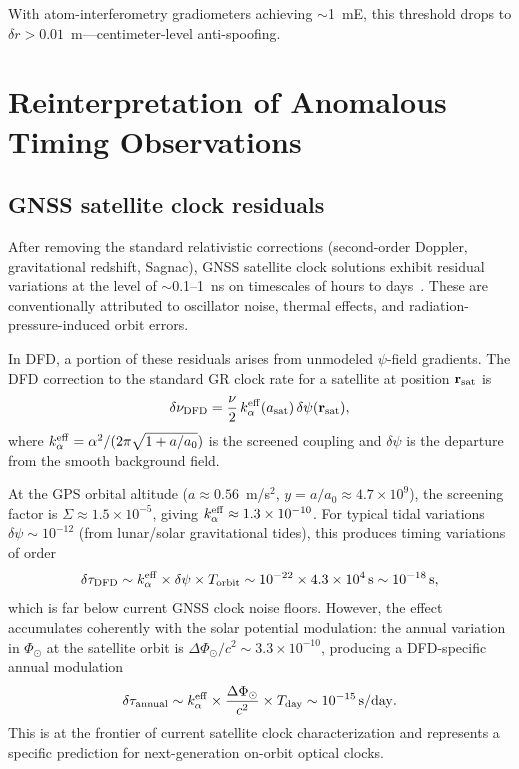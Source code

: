 \documentclass[aps,prd,twocolumn,superscriptaddress,nofootinbib]{revtex4-2}
\begin{document}
With atom-interferometry gradiometers achieving $\sim$1~mE, this
threshold drops to $\delta r > 0.01$~m---centimeter-level anti-spoofing.

\section{Reinterpretation of Anomalous Timing
Observations}\label{sec:anomalies}

\subsection{GNSS satellite clock residuals}\label{sec:gnss-residuals}

After removing the standard relativistic corrections (second-order
Doppler, gravitational redshift, Sagnac), GNSS satellite clock solutions
exhibit residual variations at the level of $\sim$0.1--1~ns on
timescales of hours to days~\cite{Senior2008,Galleani2008}. These
are conventionally attributed to oscillator noise, thermal effects, and
radiation-pressure-induced orbit errors.

In DFD, a portion of these residuals arises from unmodeled
$\psi$-field gradients. The DFD correction to the standard GR clock
rate for a satellite at position $\mathbf{r}_{\rm sat}$ is
\begin{equation}\label{eq:gnss-correction}
\delta\nu_{\rm DFD} = \frac{\nu}{2}\,k_\alpha^{\rm eff}(a_{\rm sat})
\,\delta\psi(\mathbf{r}_{\rm sat}),
\end{equation}
where $k_\alpha^{\rm eff} = \alpha^2/(2\pi\sqrt{1+a/a_0})$ is the
screened coupling and $\delta\psi$ is the departure from the
smooth background field.

At the GPS orbital altitude ($a \approx 0.56$~m/s$^2$,
$y = a/a_0 \approx 4.7\times10^9$), the screening factor is
$\Sigma \approx 1.5\times10^{-5}$, giving
$k_\alpha^{\rm eff} \approx 1.3\times10^{-10}$. For typical tidal
variations $\delta\psi \sim 10^{-12}$ (from lunar/solar gravitational
tides), this produces timing variations of order
\begin{equation}
\delta\tau_{\rm DFD} \sim k_\alpha^{\rm eff}\times\delta\psi\times T_{\rm orbit}
\sim 10^{-22}\times 4.3\times10^4\,\mathrm{s} \sim 10^{-18}\,\mathrm{s},
\end{equation}
which is far below current GNSS clock noise floors. However, the
effect accumulates coherently with the solar potential modulation:
the annual variation in $\Phi_\odot$ at the satellite orbit is
$\Delta\Phi_\odot/c^2 \sim 3.3\times10^{-10}$, producing a
DFD-specific annual modulation
\begin{equation}\label{eq:gnss-annual}
\delta\tau_{\rm annual} \sim k_\alpha^{\rm eff}\times
\frac{\Delta\Phi_\odot}{c^2}\times T_{\rm day}
\sim 10^{-15}\,\mathrm{s/day}.
\end{equation}
This is at the frontier of current satellite clock characterization
and represents a specific prediction for next-generation on-orbit
optical clocks.
\end{document}
